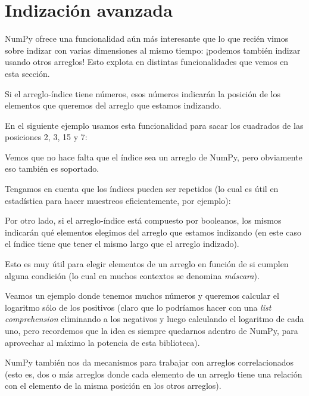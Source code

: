 \section{Indización avanzada}\label{sec:numpy_indiz}

NumPy ofrece una funcionalidad aún más interesante que lo que recién vimos sobre indizar con varias dimensiones al mismo tiempo: ¡podemos también indizar usando otros arreglos! Esto explota en distintas funcionalidades que vemos en esta sección.

Si el arreglo-índice tiene números, esos números indicarán la posición de los elementos que queremos del arreglo que estamos indizando.

En el siguiente ejemplo usamos esta funcionalidad para sacar los cuadrados de las posiciones 2, 3, 15 y 7:


Vemos que no hace falta que el índice sea un arreglo de NumPy, pero obviamente eso también es soportado.

Tengamos en cuenta que los índices pueden ser repetidos (lo cual es útil en estadística para hacer muestreos eficientemente, por ejemplo):


Por otro lado, si el arreglo-índice está compuesto por booleanos, los mismos indicarán qué elementos elegimos del arreglo que estamos indizando (en este caso el índice tiene que tener el mismo largo que el arreglo indizado).


Esto es muy útil para elegir elementos de un arreglo en función de si cumplen alguna condición (lo cual en muchos contextos se denomina \emph{máscara}).

Veamos un ejemplo donde tenemos muchos números y queremos calcular el logaritmo sólo de los positivos (claro que lo podríamos hacer con una \textit{list comprehension} eliminando a los negativos y luego calculando el logaritmo de cada uno, pero recordemos que la idea es siempre quedarnos adentro de NumPy, para aprovechar al máximo la potencia de esta biblioteca).


NumPy también nos da mecanismos para trabajar con arreglos correlacionados (esto es, dos o más arreglos donde cada elemento de un arreglo tiene una relación con el elemento de la misma posición en los otros arreglos).

